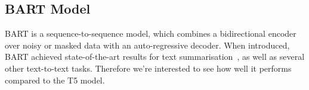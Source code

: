 \documentclass[fleqn,moreauthors,10pt]{ds_report}
\begin{document}





\subsection{BART Model}

BART is a sequence-to-sequence model, which combines a bidirectional encoder over noisy or masked data with an auto-regressive decoder. When introduced, BART achieved state-of-the-art results for text summarisation~\cite{lewis2019bart}, as well as several other text-to-text tasks. Therefore we're interested to see how well it performs compared to the T5 model.
\end{document}
